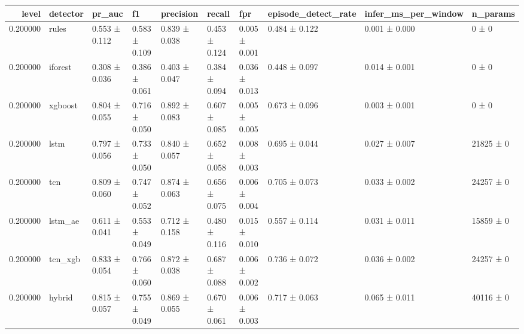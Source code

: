 \begin{tabular}{rlllllllll}
\toprule
level & detector & pr\_auc & f1 & precision & recall & fpr & episode\_detect\_rate & infer\_ms\_per\_window & n\_params \\
\midrule
0.200000 & rules & 0.553 ± 0.112 & 0.583 ± 0.109 & 0.839 ± 0.038 & 0.453 ± 0.124 & 0.005 ± 0.001 & 0.484 ± 0.122 & 0.001 ± 0.000 & 0 ± 0 \\
0.200000 & iforest & 0.308 ± 0.036 & 0.386 ± 0.061 & 0.403 ± 0.047 & 0.384 ± 0.094 & 0.036 ± 0.013 & 0.448 ± 0.097 & 0.014 ± 0.001 & 0 ± 0 \\
0.200000 & xgboost & 0.804 ± 0.055 & 0.716 ± 0.050 & 0.892 ± 0.083 & 0.607 ± 0.085 & 0.005 ± 0.005 & 0.673 ± 0.096 & 0.003 ± 0.001 & 0 ± 0 \\
0.200000 & lstm & 0.797 ± 0.056 & 0.733 ± 0.050 & 0.840 ± 0.057 & 0.652 ± 0.058 & 0.008 ± 0.003 & 0.695 ± 0.044 & 0.027 ± 0.007 & 21825 ± 0 \\
0.200000 & tcn & 0.809 ± 0.060 & 0.747 ± 0.052 & 0.874 ± 0.063 & 0.656 ± 0.075 & 0.006 ± 0.004 & 0.705 ± 0.073 & 0.033 ± 0.002 & 24257 ± 0 \\
0.200000 & lstm\_ae & 0.611 ± 0.041 & 0.553 ± 0.049 & 0.712 ± 0.158 & 0.480 ± 0.116 & 0.015 ± 0.010 & 0.557 ± 0.114 & 0.031 ± 0.011 & 15859 ± 0 \\
0.200000 & tcn\_xgb & 0.833 ± 0.054 & 0.766 ± 0.060 & 0.872 ± 0.038 & 0.687 ± 0.088 & 0.006 ± 0.002 & 0.736 ± 0.072 & 0.036 ± 0.002 & 24257 ± 0 \\
0.200000 & hybrid & 0.815 ± 0.057 & 0.755 ± 0.049 & 0.869 ± 0.055 & 0.670 ± 0.061 & 0.006 ± 0.003 & 0.717 ± 0.063 & 0.065 ± 0.011 & 40116 ± 0 \\
\bottomrule
\end{tabular}
